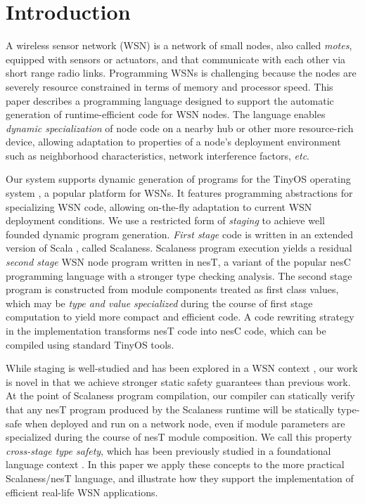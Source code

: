\section{Introduction}

A wireless sensor network (WSN) is a network of small nodes, also called \textit{motes},
equipped with sensors or actuators, and that communicate with each other via short range radio
links. Programming WSNs is challenging because the nodes are severely resource constrained in
terms of memory and processor speed. This paper describes a programming language designed to
support the automatic generation of runtime-efficient code for WSN nodes. The language enables
\emph{dynamic specialization} of node code on a nearby hub or other more resource-rich device,
allowing adaptation to properties of a node's deployment environment such as neighborhood
characteristics, network interference factors, \emph{etc}.

Our system supports dynamic generation of programs for the TinyOS operating system
\cite{TinyOS}, a popular platform for WSNs. It features programming abstractions for
specializing WSN code, allowing on-the-fly adaptation to current WSN deployment conditions. We
use a restricted form of \emph{staging} \cite{Taha-MetaML,DBLP:conf/icess/Taha04,289140} to
achieve well founded dynamic program generation. \emph{First stage} code is written in an
extended version of Scala \cite{PiS2}, called Scalaness. Scalaness program execution yields a
residual \emph{second stage} WSN node program written in nesT, a variant of the popular nesC
programming language \cite{Gay-nesC-2003} with a stronger type checking analysis. The second
stage program is constructed from module components treated as first class values, which may be
\emph{type and value specialized} during the course of first stage computation to yield more
compact and efficient code. A code rewriting strategy in the implementation transforms nesT code
into nesC code, which can be compiled using standard TinyOS tools.

While staging is well-studied and has been explored in a WSN context \cite{Mainland-Flask-2008},
our work is novel in that we achieve stronger static safety guarantees than previous work. At
the point of Scalaness program compilation, our compiler can statically verify that any nesT
program produced by the Scalaness runtime will be statically type-safe when deployed and run on
a network node, even if module parameters are specialized during the course of nesT module
composition. We call this property \emph{cross-stage type safety}, which has been previously
studied in a foundational language context \cite{FramedML}. In this paper we apply these
concepts to the more practical Scalaness/nesT language, and illustrate how they support the
implementation of efficient real-life WSN applications.

